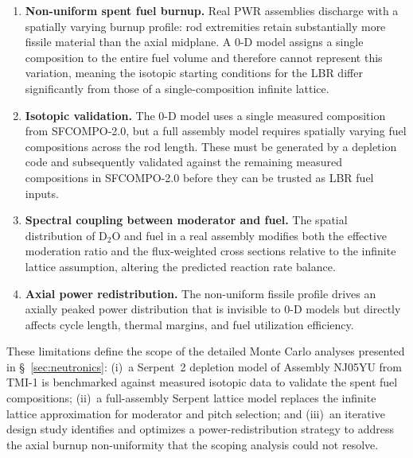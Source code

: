 \begin{enumerate}
    \item \textbf{Non-uniform spent fuel burnup.} Real PWR assemblies discharge with a spatially varying burnup profile: rod extremities retain substantially more fissile material than the axial midplane. A 0-D model assigns a single composition to the entire fuel volume and therefore cannot represent this variation, meaning the isotopic starting conditions for the LBR differ significantly from those of a single-composition infinite lattice.
    \item \textbf{Isotopic validation.} The 0-D model uses a single measured composition from SFCOMPO-2.0, but a full assembly model requires spatially varying fuel compositions across the rod length. These must be generated by a depletion code and subsequently validated against the remaining measured compositions in SFCOMPO-2.0 before they can be trusted as LBR fuel inputs.
    \item \textbf{Spectral coupling between moderator and fuel.} The spatial distribution of D$_2$O and fuel in a real assembly modifies both the effective moderation ratio and the flux-weighted cross sections relative to the infinite lattice assumption, altering the predicted reaction rate balance.
    \item \textbf{Axial power redistribution.} The non-uniform fissile profile drives an axially peaked power distribution that is invisible to 0-D models but directly affects cycle length, thermal margins, and fuel utilization efficiency.
\end{enumerate}

These limitations define the scope of the detailed Monte Carlo analyses presented in \S~\ref{sec:neutronics}: (i)~a Serpent~2 depletion model of Assembly NJ05YU from TMI-1 is benchmarked against measured isotopic data to validate the spent fuel compositions; (ii)~a full-assembly Serpent lattice model replaces the infinite lattice approximation for moderator and pitch selection; and (iii)~an iterative design study identifies and optimizes a power-redistribution strategy to address the axial burnup non-uniformity that the scoping analysis could not resolve.